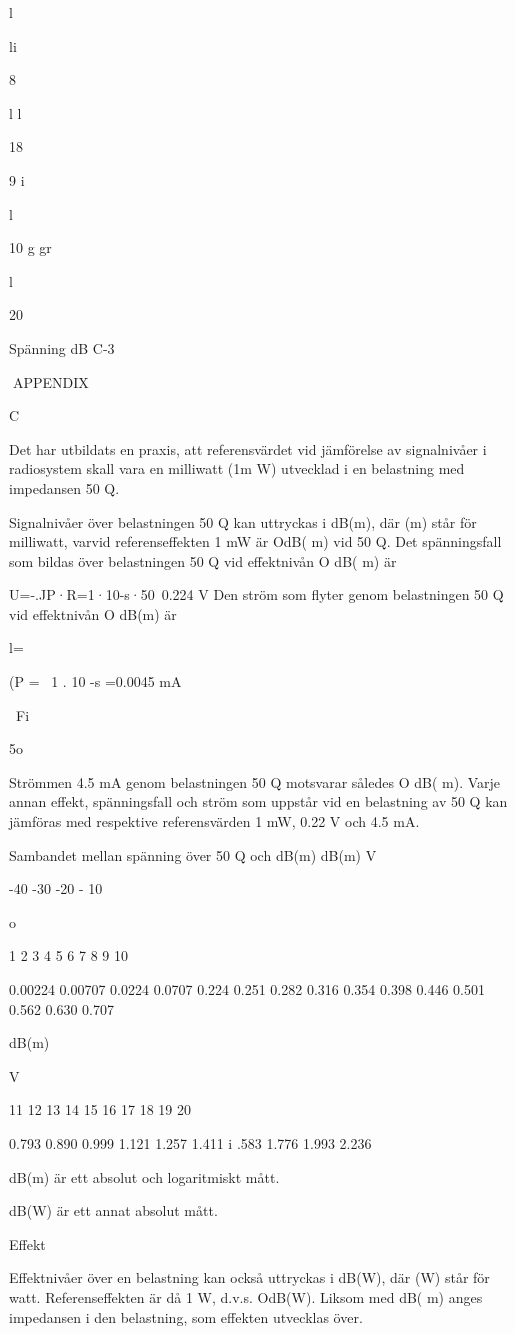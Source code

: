 \documentclass[a4paper,twoside,twocolumn,openright]{book}
\begin{document}
{{{{{{{{{{{{{l

li

8

l
l

18

9
i

l

10 g gr

l

20

Spänning
dB
C-3

APPENDIX

C

Det har utbildats en praxis, att referensvärdet vid jämförelse av signalnivåer i radiosystem skall vara en milliwatt (1m W) utvecklad i en belastning med impedansen 50 Q.

Signalnivåer över belastningen 50 Q kan
uttryckas i dB(m), där (m) står för milliwatt,
varvid referenseffekten 1 mW är OdB( m) vid
50 Q.
Det spänningsfall som bildas över belastningen 50 Q vid effektnivån O dB( m) är

U=-.JP·R=1·10-s·50~0.224 V
Den ström som flyter genom belastningen
50 Q vid effektnivån O dB(m) är

l=

(P =~ 1 . 10 -s =0.0045 mA

~Fi

5o

Strömmen 4.5 mA genom belastningen 50 Q
motsvarar således O dB( m).
Varje annan effekt, spänningsfall och ström
som uppstår vid en belastning av 50 Q kan
jämföras med respektive referensvärden
1 mW, 0.22 V och 4.5 mA.

Sambandet mellan spänning över 50 Q
och dB(m)
dB(m) V

-40
-30
-20
- 10

o

1
2
3
4
5
6
7
8
9
10

0.00224
0.00707
0.0224
0.0707
0.224
0.251
0.282
0.316
0.354
0.398
0.446
0.501
0.562
0.630
0.707

dB(m)

V

11
12
13
14
15
16
17
18
19
20

0.793
0.890
0.999
1.121
1.257
1.411
i .583
1.776
1.993
2.236

dB(m) är ett absolut och logaritmiskt mått.

dB(W) är ett annat absolut mått.

Effekt

Effektnivåer över en belastning kan också
uttryckas i dB(W), där (W) står för watt.
Referenseffekten är då 1 W, d.v.s. OdB(W).
Liksom med dB( m) anges impedansen i den
belastning, som effekten utvecklas över.

}}}}}}}}}}}}}
\end{document}
